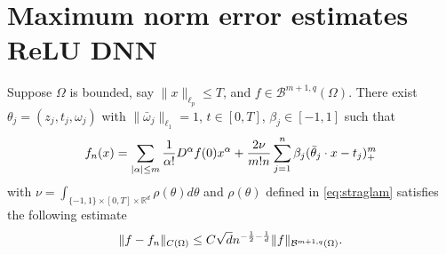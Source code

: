 \section{Maximum norm error estimates ReLU DNN}
\begin{lemma}\label{lm:Cstratifyrange1}
Suppose $\Omega$ is bounded, say $\|x\|_{\ell_p}\le T$, and $f\in \mathcal B^{m+1, q}(\Omega)$.
There exist $\theta_j=(z_j, t_j, \omega_j)$ with $\|\bar \omega_j\|_{\ell_1}=1$, $t\in [0,T]$,  $\beta_j\in [-1,1]$ such that 
$$
f_n(x)= \sum_{|\alpha|\le m}{1\over \alpha!}D^\alpha f(0) x^\alpha + {2\nu\over m!n}\sum_{j=1}^{n}\beta_j (\bar \theta_j\cdot x - t_j)_+^m
$$ 
with $\nu=\int_{\{-1,1\}\times [0,T]\times \mathbb{R}^{d}} \rho(\theta)d\theta$ and $\rho(\theta)$  defined in \eqref{eq:straglam} 
satisfies the following estimate
\begin{equation}
\|f - f_n \|_{C(\Omega)} \leq C\sqrt{d} n^{-{1\over 2}-{1\over d}}\|f\|_{\mathcal B^{m+1, q}(\Omega)}.
\end{equation}   
\end{lemma}
